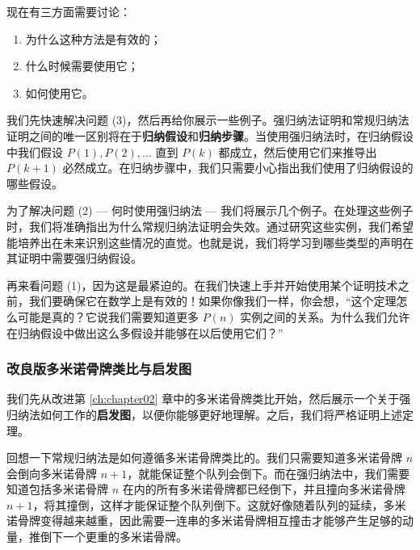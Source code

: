 现在有三方面需要讨论：
\begin{enumerate}[label=(\arabic*)]
    \item 为什么这种方法是有效的；
    \item 什么时候需要使用它；
    \item 如何使用它。
\end{enumerate}
我们先快速解决问题 (3)，然后再给你展示一些例子。强归纳法证明和常规归纳法证明之间的唯一区别将在于\textbf{归纳假设}和\textbf{归纳步骤}。当使用强归纳法时，在归纳假设中我们假设 $P(1), P(2), \dots$ 直到 $P(k)$ 都成立，然后使用它们来推导出 $P(k+1)$ 必然成立。在归纳步骤中，我们只需要小心指出我们使用了归纳假设的哪些假设。

为了解决问题 (2) --- 何时使用强归纳法 --- 我们将展示几个例子。在处理这些例子时，我们将准确指出为什么常规归纳法证明会失效。通过研究这些实例，我们希望能培养出在未来识别这些情况的直觉。也就是说，我们将学习到哪些类型的声明在其证明中需要强归纳假设。

再来看问题 (1)，因为这是最紧迫的。在我们快速上手并开始使用某个证明技术之前，我们要确保它在数学上是有效的！如果你像我们一样，你会想，``这个定理怎么可能是真的？它说我们需要知道更多 $P(n)$ 实例之间的关系。为什么我们允许在归纳假设中做出这么多假设并能够在以后使用它们？''

\subsubsection*{改良版多米诺骨牌类比与启发图}

我们先从改进第 \ref{ch:chapter02} 章中的多米诺骨牌类比开始，然后展示一个关于强归纳法如何工作的\textbf{启发图}，以便你能够更好地理解。之后，我们将严格证明上述定理。

回想一下常规归纳法是如何遵循多米诺骨牌类比的。我们只需要知道多米诺骨牌 $n$ 会倒向多米诺骨牌 $n+1$，就能保证整个队列会倒下。而在强归纳法中，我们需要知道包括多米诺骨牌 $n$ 在内的所有多米诺骨牌都已经倒下，并且撞向多米诺骨牌 $n+1$，将其撞倒，这样才能保证整个队列倒下。这就好像随着队列的延续，多米诺骨牌变得越来越重，因此需要一连串的多米诺骨牌相互撞击才能够产生足够的动量，推倒下一个更重的多米诺骨牌。

